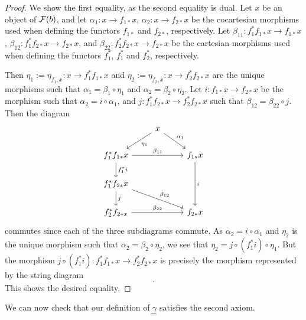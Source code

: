 \documentclass{amsart}
\begin{document}
    \begin{proof}
        We show the first equality, as the second equality is dual.
        Let $x$ be an object of $\mathcal F(b)$,
            and let $\alpha_1:x\to f_{1\ast} x$,
            $\alpha_2:x\to f_{2\ast} x$
            be the cocartesian morphisms used when defining the functors
            $f_{1\ast}$ and $f_{2\ast}$, respectively.
        Let $\beta_{11}:f_1^\ast f_{1\ast}x\to f_{1\ast}x$,
            $\beta_{12}:f_1^\ast f_{2\ast}x \to f_{2\ast}x$,
            and $\beta_{22}:f_2^\ast f_{2\ast}x\to f_{2\ast}x$
            be the cartesian morphisms used when defining the functors
            $f_1^\ast$, $f_1^\ast$ and $f_2^\ast$, respectively.

        Then $\eta_1:=\eta_{f_1,x}:x\to f_1^\ast f_{1\ast} x$
            and $\eta_2:=\eta_{f_2,x}:x\to f_2^\ast f_{2\ast}x$
            are the unique morphisms such that $\alpha_1=\beta_1\circ \eta_1$
            and $\alpha_2=\beta_2\circ \eta_2$.
        Let $i:f_{1\ast}x\to f_{2\ast}x$ be the morphism such that
            $\alpha_2=i\circ \alpha_1$,
            and
            $j:f_1^\ast f_{2\ast}x\to f_2^\ast f_{2\ast}x$ such that
            $\beta_{12}=\beta_{22}\circ j$.
        Then the diagram
        \[
            \begin{tikzcd}
                 & x \arrow[rd,"\alpha_1"]\arrow[ld,"\eta_1"]& \\
                f_1^\ast f_{1\ast} x \arrow[rr,"\beta_{11}"]\arrow[d,"f_1^\ast i"]&  & f_{1\ast}x
                    \arrow[dd,"i"]\\
                f_1^\ast f_{2\ast} x \arrow[rrd,"\beta_{12}"]\arrow[d,"j"]& &  \\
                f_2^\ast f_{2\ast x} \arrow[rr,"\beta_{22}"] & & f_{2\ast} x
            \end{tikzcd}
        \]
            commutes since each of the three subdiagrams commute.
        As $\alpha_2=i\circ \alpha_1$ and $\eta_2$ is the unique morphism such that
            $\alpha_2=\beta_2\circ \eta_2$,
            we see that $\eta_2=j\circ(f_1^\ast i)\circ\eta_1$.
        But the morphism $j\circ (f_1^\ast i):f_1^\ast f_{1\ast} x\to f_2^\ast f_{2\ast} x$
            is precisely the morphism represented by the string diagram
        \[
            
            .
        \]
        This shows the desired equality.
    \end{proof}
    We can now check that our definition of $\gamma$ satisfies the second axiom.
    \[
        
        \quad=\quad
        
    \]
\end{document}
